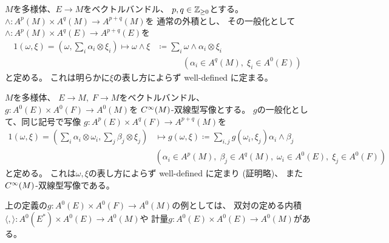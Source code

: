 \documentclass[report]{jlreq}
\begin{document}
\begin{definition}[ベクトルバンドル値形式の外積]
    $M$を多様体、$E \to M$をベクトルバンドル、
    $p, q \in \mathbb{Z}_{\ge 0}$とする。
    $\wedge \colon A^p(M) \times A^q(M) \to A^{p + q}(M)$を
    通常の外積とし、
    その一般化として
    $\wedge \colon A^p(M) \times A^q(E) \to A^{p + q}(E)$を
    \begin{alignat}{1}
        (\omega, \xi)
            = \left(
                \omega,
                \sum_{i} \alpha_i \otimes \xi_i
            \right)
            \mapsto
            \omega \wedge \xi
            &\coloneqq
            \sum_{i} \omega \wedge \alpha_i \otimes \xi_i \\
        &\qquad \quad
            (\alpha_i \in A^q(M), \; \xi_i \in A^0(E))
    \end{alignat}
    と定める。
    これは明らかに$\xi$の表し方によらず well-defined に定まる。
\end{definition}

\begin{definition}[ベクトルバンドル値形式の内積]
    $M$を多様体、
    $E \to M, \; F \to M$をベクトルバンドル、
    $g \colon A^0(E) \times A^0(F) \to A^0(M)$を
    $C^\infty(M)$-双線型写像とする。
    $g$の一般化として、同じ記号で写像
    $g \colon A^p(E) \times A^q(F) \to A^{p + q}(M)$を
    \begin{alignat}{1}
        (\omega, \xi)
            = \left(
                \sum_{i} \alpha_i \otimes \omega_i,
                \sum_{j} \beta_j \otimes \xi_j
            \right)
            &\mapsto
            g(\omega, \xi)
            \coloneqq
            \sum_{i, j}
            g(\omega_i, \xi_j)
            \alpha_i \wedge \beta_j \\
        &
            (
                \alpha_i \in A^p(M), \; \beta_j \in A^q(M), \;
                \omega_i \in A^0(E), \; \xi_j \in A^0(F)
            )
    \end{alignat}
    と定める。
    これは$\omega, \xi$の表し方によらず well-defined に定まり (証明略)、
    また$C^\infty(M)$-双線型写像である。
\end{definition}

\begin{remark}
    上の定義の$g \colon A^0(E) \times A^0(F) \to A^0(M)$の例としては、
    双対の定める内積$\langle , \rangle \colon A^0(E^*) \times A^0(E) \to A^0(M)$や
    計量$g \colon A^0(E) \times A^0(E) \to A^0(M)$がある。
\end{remark}
\end{document}
